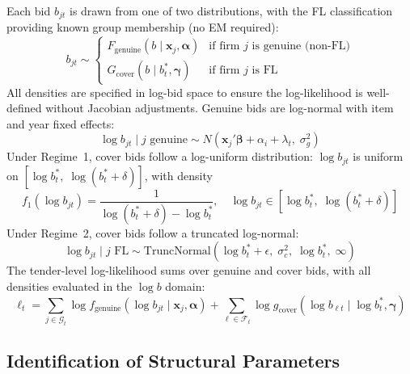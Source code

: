Each bid $b_{jt}$ is drawn from one of two distributions, with the FL classification providing known group membership (no EM required):
\begin{equation}
  b_{jt} \sim
  \begin{cases}
    F_{\text{genuine}}(b \mid \mathbf{x}_j, \boldsymbol{\alpha}) &
      \text{if firm } j \text{ is genuine (non-FL)} \\
    G_{\text{cover}}(b \mid b^*_t, \boldsymbol{\gamma}) &
      \text{if firm } j \text{ is FL}
  \end{cases}
  \label{eq:mixture}
\end{equation}
All densities are specified in log-bid space to ensure the
log-likelihood is well-defined without Jacobian adjustments.
Genuine bids are log-normal with item and year fixed effects:
\begin{equation}
  \log b_{jt} \mid j \text{ genuine} \sim
  N\!\left(\mathbf{x}_j'\boldsymbol{\beta} + \alpha_i + \lambda_t,
  \; \sigma_g^2\right)
  \label{eq:genuine_dist}
\end{equation}
Under Regime~1, cover bids follow a log-uniform distribution:
$\log b_{jt}$ is uniform on $[\log b^*_t, \; \log(b^*_t + \delta)]$,
with density
\begin{equation}
  f_1(\log b_{jt}) = \frac{1}{\log(b^*_t + \delta) - \log b^*_t},
  \quad \log b_{jt} \in [\log b^*_t, \; \log(b^*_t + \delta)]
  \label{eq:cover_dist_r1}
\end{equation}
Under Regime~2, cover bids follow a truncated log-normal:
\begin{equation}
  \log b_{jt} \mid j \text{ FL} \sim
  \text{TruncNormal}\!\left(\log b^*_t + \epsilon, \;
  \sigma_c^2, \; \log b^*_t, \; \infty\right)
  \label{eq:cover_dist_r2}
\end{equation}
The tender-level log-likelihood sums over genuine and cover bids,
with all densities evaluated in the $\log b$ domain:
\begin{equation}
  \ell_t = \sum_{j \in \mathcal{G}_t} \log f_{\text{genuine}}(\log b_{jt}
  \mid \mathbf{x}_j, \boldsymbol{\alpha})
  + \sum_{\ell \in \mathcal{F}_t} \log g_{\text{cover}}(\log b_{\ell t}
  \mid \log b^*_t, \boldsymbol{\gamma})
  \label{eq:loglik}
\end{equation}


\subsection{Identification of Structural Parameters}
\label{sec:identification}

